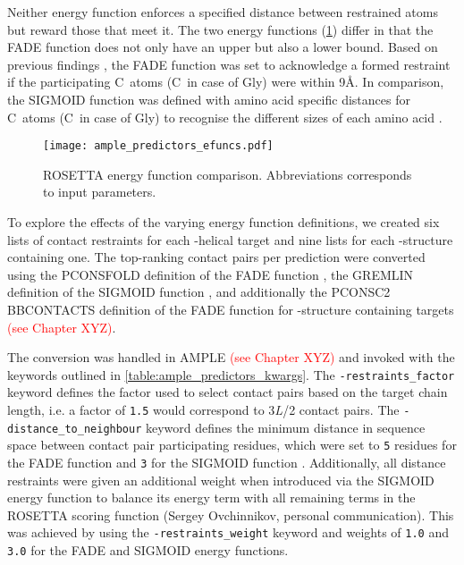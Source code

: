 Neither energy function enforces a specified distance between restrained atoms but reward those that meet it. The two energy functions (\cref{fig:ample_predictors_efuncs}) differ in that the FADE function does not only have an upper but also a lower bound. Based on previous findings \cite{Michel2014-eg, Skwark2014-qp}, the FADE function was set to acknowledge a formed restraint if the participating C\textbeta\ atoms (C\textalpha\ in case of Gly) were within 9\AA. In comparison, the SIGMOID function was defined with amino acid specific distances for C\textbeta\ atoms (C\textalpha\ in case of Gly) to recognise the different sizes of each amino acid \cite{Kamisetty2013-le, Ovchinnikov2015-tn}.

\begin{figure}[H]
    \centering
    \texttt{[image: ample\_predictors\_efuncs.pdf]}
    \caption{ROSETTA energy function comparison. Abbreviations corresponds to input parameters.}
    \label{fig:ample_predictors_efuncs}
\end{figure}

To explore the effects of the varying energy function definitions, we created six lists of contact restraints for each \textalpha-helical target and nine lists for each \textbeta-structure containing one. The top-ranking contact pairs per prediction were converted using the PCONSFOLD definition of the FADE function \cite{Michel2014-eg}, the GREMLIN definition of the SIGMOID function \cite{Ovchinnikov2015-tn}, and additionally the PCONSC2 BBCONTACTS definition of the FADE function for \textbeta-structure containing targets \textcolor{red}{(see Chapter XYZ)}.

The conversion was handled in AMPLE \textcolor{red}{(see Chapter XYZ)} and invoked with the keywords outlined in \cref{table:ample_predictors_kwargs}. The \texttt{-restraints\_factor} keyword defines the factor used to select contact pairs based on the target chain length, i.e. a factor of \texttt{1.5} would correspond to 3\textit{L}/2 contact pairs. The \texttt{-distance\_to\_neighbour} keyword defines the minimum distance in sequence space between contact pair participating residues, which were set to \texttt{5} residues for the FADE function \cite{Michel2014-eg} and \texttt{3} for the SIGMOID function \cite{Ovchinnikov2015-tn}. Additionally, all distance restraints were given an additional weight when introduced via the SIGMOID energy function to balance its energy term with all remaining terms in the ROSETTA scoring function (Sergey Ovchinnikov, personal communication). This was achieved by using the \texttt{-restraints\_weight} keyword and weights of \texttt{1.0} and \texttt{3.0} for the FADE and SIGMOID energy functions.

